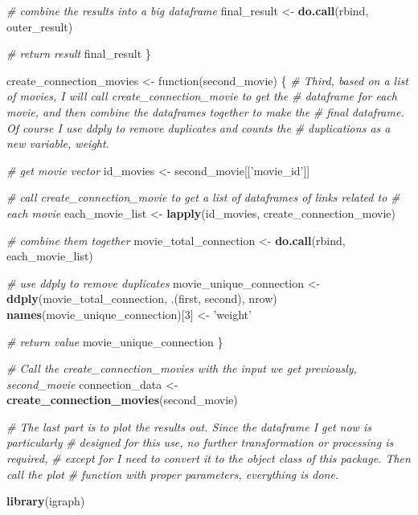 \documentclass[]{article}
\newenvironment{Shaded}{\begin{snugshade}}{\end{snugshade}}
\newcommand{\KeywordTok}[1]{\textcolor[rgb]{0.13,0.29,0.53}{\textbf{{#1}}}}
\newcommand{\DecValTok}[1]{\textcolor[rgb]{0.00,0.00,0.81}{{#1}}}
\newcommand{\StringTok}[1]{\textcolor[rgb]{0.31,0.60,0.02}{{#1}}}
\newcommand{\CommentTok}[1]{\textcolor[rgb]{0.56,0.35,0.01}{\textit{{#1}}}}
\newcommand{\NormalTok}[1]{{#1}}
\begin{document}
\begin{Shaded}
\begin{Highlighting}[]
  \CommentTok{# combine the results into a big dataframe}
  \NormalTok{final_result <-}\StringTok{ }\KeywordTok{do.call}\NormalTok{(rbind, outer_result)}

  \CommentTok{# return result}
  \NormalTok{final_result}
\NormalTok{\}}

\NormalTok{create_connection_movies <-}\StringTok{ }\NormalTok{function(second_movie) \{}
  \CommentTok{# Third, based on a list of movies, I will call create_connection_movie to get the }
  \CommentTok{# dataframe for each movie, and then combine the dataframes together to make the}
  \CommentTok{# final dataframe. Of course I use ddply to remove duplicates and counts the}
  \CommentTok{# duplications as a new variable, weight.}

  \CommentTok{# get movie vector}
  \NormalTok{id_movies <-}\StringTok{ }\NormalTok{second_movie[[}\StringTok{'movie_id'}\NormalTok{]]}

  \CommentTok{# call create_connection_movie to get a list of dataframes of links related to}
  \CommentTok{# each movie}
  \NormalTok{each_movie_list <-}\StringTok{ }\KeywordTok{lapply}\NormalTok{(id_movies, create_connection_movie)}

  \CommentTok{# combine them together}
  \NormalTok{movie_total_connection <-}\StringTok{ }\KeywordTok{do.call}\NormalTok{(rbind, each_movie_list)}

  \CommentTok{# use ddply to remove duplicates}
  \NormalTok{movie_unique_connection <-}\StringTok{ }\KeywordTok{ddply}\NormalTok{(movie_total_connection, .(first, second), nrow)}
  \KeywordTok{names}\NormalTok{(movie_unique_connection)[}\DecValTok{3}\NormalTok{] <-}\StringTok{ 'weight'}

  \CommentTok{# return value}
  \NormalTok{movie_unique_connection}
\NormalTok{\}}

\CommentTok{# Call the create_connection_movies with the input we get previously, second_movie}
\NormalTok{connection_data <-}\StringTok{ }\KeywordTok{create_connection_movies}\NormalTok{(second_movie)}

\CommentTok{# The last part is to plot the results out. Since the dataframe I get now is particularly}
\CommentTok{# designed for this use, no further transformation or processing is required,}
\CommentTok{# except for I need to convert it to the object class of this package. Then call the plot}
\CommentTok{# function with proper parameters, everything is done.}

\KeywordTok{library}\NormalTok{(igraph)}
\end{Highlighting}
\end{Shaded}
\end{document}

